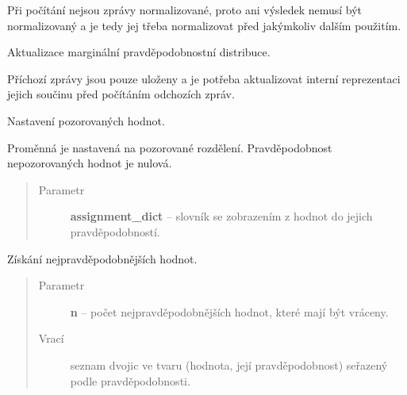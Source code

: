 \begin{fulllineitems}
\begin{fulllineitems}
Při počítání nejsou zprávy normalizované, proto ani výsledek nemusí být
normalizovaný a je tedy jej třeba normalizovat před jakýmkoliv dalším
použitím.

\end{fulllineitems}


\begin{fulllineitems}
\label{alex.infer:alex.infer.factor.alex.infer.node.DiscreteVariableNode.update}
Aktualizace marginální pravděpodobnostní distribuce.

Příchozí zprávy jsou pouze uloženy a je potřeba aktualizovat interní
reprezentaci jejich součinu před počítáním odchozích zpráv.

\end{fulllineitems}


\begin{fulllineitems}
\label{alex.infer:alex.infer.factor.alex.infer.node.DiscreteVariableNode.observed}
Nastavení pozorovaných hodnot.

Proměnná je nastavená na pozorované rozdělení. Pravděpodobnost nepozorovaných hodnot
je nulová.
\begin{quote}\begin{description}
\item[{Parametr}] \leavevmode
\textbf{assignment\_dict} -- slovník se zobrazením z hodnot do jejich pravděpodobností.

\end{description}\end{quote}

\end{fulllineitems}


\begin{fulllineitems}
\label{alex.infer:alex.infer.factor.alex.infer.node.DiscreteVariableNode.most_probable}
Získání nejpravděpodobnějších hodnot.
\begin{quote}\begin{description}
\item[{Parametr}] \leavevmode
\textbf{n} -- počet nejpravděpodobnějších hodnot, které mají být vráceny.

\item[{Vrací}] \leavevmode
seznam dvojic ve tvaru (hodnota, její pravděpodobnost) seřazený podle pravděpodobnosti.

\end{description}\end{quote}

\end{fulllineitems}


\end{fulllineitems}


